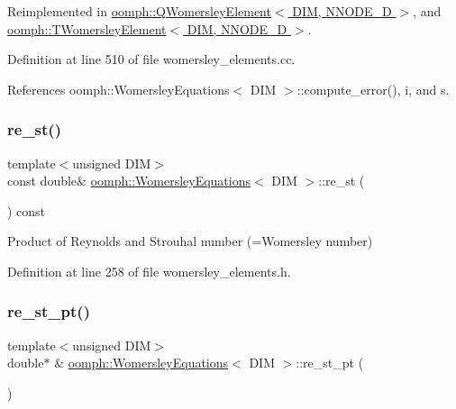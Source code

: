 Reimplemented in \hyperlink{classoomph_1_1QWomersleyElement_a2730f3cf9212c0b5cbc22939a376af07}{oomph\+::\+Q\+Womersley\+Element$<$ D\+I\+M, N\+N\+O\+D\+E\+\_\+D $>$}, and \hyperlink{classoomph_1_1TWomersleyElement_a2ff66a70ff364d1ddfc0ef0a99ad70cb}{oomph\+::\+T\+Womersley\+Element$<$ D\+I\+M, N\+N\+O\+D\+E\+\_\+D $>$}.



Definition at line 510 of file womersley\+\_\+elements.\+cc.



References oomph\+::\+Womersley\+Equations$<$ D\+I\+M $>$\+::compute\+\_\+error(), i, and s.

\mbox{\label{classoomph_1_1WomersleyEquations_a4db194b9f71a69779b3450d40288b55d}} 
\subsubsection{\texorpdfstring{re\+\_\+st()}{re\_st()}}
{\footnotesize\ttfamily template$<$unsigned D\+IM$>$ \\
const double\& \hyperlink{classoomph_1_1WomersleyEquations}{oomph\+::\+Womersley\+Equations}$<$ D\+IM $>$\+::re\+\_\+st (\begin{DoxyParamCaption}{ }\end{DoxyParamCaption}) const\hspace{0.3cm}{\ttfamily [inline]}}



Product of Reynolds and Strouhal number (=Womersley number) 



Definition at line 258 of file womersley\+\_\+elements.\+h.

\mbox{\label{classoomph_1_1WomersleyEquations_aaca21f4cfb0b6614b9b796073ce9c8b8}} 
\subsubsection{\texorpdfstring{re\+\_\+st\+\_\+pt()}{re\_st\_pt()}}
{\footnotesize\ttfamily template$<$unsigned D\+IM$>$ \\
double$\ast$ \& \hyperlink{classoomph_1_1WomersleyEquations}{oomph\+::\+Womersley\+Equations}$<$ D\+IM $>$\+::re\+\_\+st\+\_\+pt (\begin{DoxyParamCaption}{ }\end{DoxyParamCaption})\hspace{0.3cm}{\ttfamily [inline]}}



